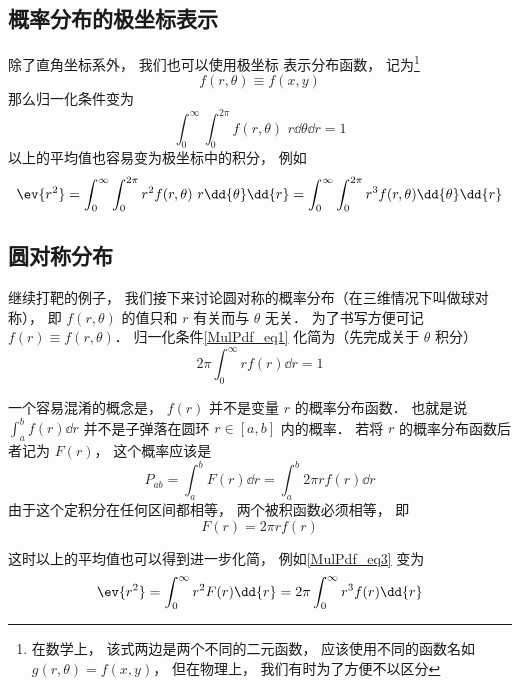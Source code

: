 
\subsection{概率分布的极坐标表示}

除了直角坐标系外， 我们也可以使用极坐标 表示分布函数， 记为\footnote{在数学上， 该式两边是两个不同的二元函数， 应该使用不同的函数名如 $g(r, \theta) = f(x, y)$， 但在物理上， 我们有时为了方便不以区分}
\begin{equation}
f(r, \theta) \equiv f(x, y)
\end{equation}
那么归一化条件变为
\begin{equation}\label{MulPdf_eq1}
\int_0^\infty \int_{0}^{2\pi} f(r, \theta)\,\, r\dd{\theta}\dd{r} = 1
\end{equation}
以上的平均值也容易变为极坐标中的积分， 例如
\begin{equation}\label{MulPdf_eq3}
\ev{r^2} = \int_0^\infty \int_{0}^{2\pi} r^2 f(r, \theta)\,\, r\dd{\theta}\dd{r}
= \int_0^\infty \int_{0}^{2\pi} r^3 f(r, \theta) \dd{\theta}\dd{r}
\end{equation}


\subsection{圆对称分布}
继续打靶的例子， 我们接下来讨论圆对称的概率分布（在三维情况下叫做球对称）， 即 $f(r, \theta)$ 的值只和 $r$ 有关而与 $\theta$ 无关． 为了书写方便可记 $f(r) \equiv f(r, \theta)$． 归一化条件\autoref{MulPdf_eq1} 化简为（先完成关于 $\theta$ 积分）
\begin{equation}
2\pi \int_0^\infty r f(r) \dd{r} = 1
\end{equation}

一个容易混淆的概念是， $f(r)$ 并不是变量 $r$ 的概率分布函数． 也就是说 $\int_a^b f(r) \dd{r}$ 并不是子弹落在圆环 $r \in [a, b]$ 内的概率． 若将 $r$ 的概率分布函数后者记为 $F(r)$， 这个概率应该是
\begin{equation}\label{MulPdf_eq4}
P_{ab} = \int_a^b F(r) \dd{r} = \int_a^b 2\pi r f(r) \dd{r}
\end{equation}
由于这个定积分在任何区间都相等， 两个被积函数必须相等， 即
\begin{equation}\label{MulPdf_eq5}
F(r) = 2\pi r f(r)
\end{equation}

这时以上的平均值也可以得到进一步化简， 例如\autoref{MulPdf_eq3} 变为
\begin{equation}
\ev{r^2} = \int_0^\infty r^2 F(r) \dd{r}
= 2\pi \int_0^\infty r^3 f(r) \dd{r}
\end{equation}
